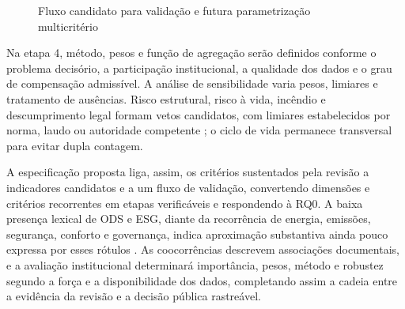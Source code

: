 \begin{figure}[htbp]
\centering
{}
\caption{Fluxo candidato para validação e futura parametrização multicritério}
\label{fig:fluxoprotocolo}
\end{figure}

Na etapa 4, método, pesos e função de agregação serão definidos conforme o problema decisório, a participação institucional, a qualidade dos dados e o grau de compensação admissível. A análise de sensibilidade varia pesos, limiares e tratamento de ausências. Risco estrutural, risco à vida, incêndio e descumprimento legal formam vetos candidatos, com limiares estabelecidos por norma, laudo ou autoridade competente \parencite{abnt_nbr5674_2012,araujoneto_manutencaolegislacao_2015}; o ciclo de vida permanece transversal para evitar dupla contagem.

A especificação proposta liga, assim, os critérios sustentados pela revisão a indicadores candidatos e a um fluxo de validação, convertendo dimensões e critérios recorrentes em etapas verificáveis e respondendo à RQ0. A baixa presença lexical de ODS e ESG, diante da recorrência de energia, emissões, segurança, conforto e governança, indica aproximação substantiva ainda pouco expressa por esses rótulos \parencite{ramantswana_esgfm_2026}. As coocorrências descrevem associações documentais, e a avaliação institucional determinará importância, pesos, método e robustez segundo a força e a disponibilidade dos dados, completando assim a cadeia entre a evidência da revisão e a decisão pública rastreável.
